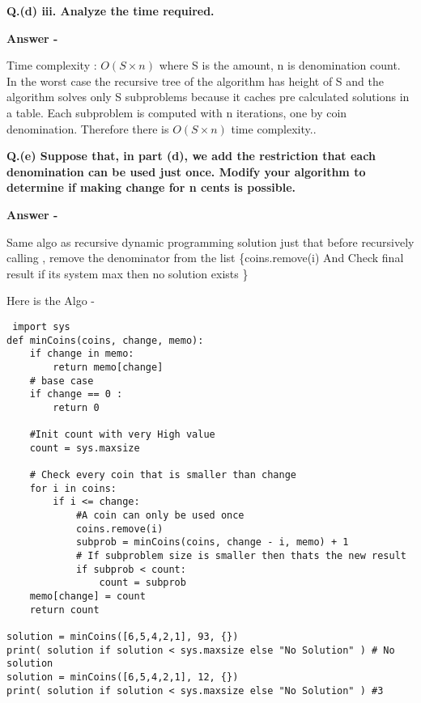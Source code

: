 \documentclass[5pt]{article}
\begin{document}
  \textbf{Q.(d) iii. Analyze the time required.} 
\setlength{\parskip}{1.2em}
\setlength{\parindent}{0em}

\textbf{Answer -}

Time complexity : $O(S \times n) $ where S is the amount, n is denomination count. In the worst case the recursive tree of the algorithm has height of S and the algorithm solves only S subproblems because it caches pre calculated solutions in a table. Each subproblem is computed with n iterations, one by coin denomination. Therefore there is $O(S \times n)$ time complexity..

  
 \textbf{Q.(e) Suppose that, in part (d), we add the restriction that each denomination can be used just once.
Modify your algorithm to determine if making change for n cents is possible.} 
\setlength{\parskip}{1.2em}
\setlength{\parindent}{0em}

\textbf{Answer -}

Same algo as recursive dynamic programming solution just that before recursively calling , remove the denominator from the list \{coins.remove(i) And 
Check final result if its system max then no solution exists 
\}

Here is the Algo -

\begin{lstlisting}
 import sys
def minCoins(coins, change, memo):
    if change in memo:
        return memo[change]
    # base case
    if change == 0 :
        return 0

    #Init count with very High value
    count = sys.maxsize

    # Check every coin that is smaller than change
    for i in coins:
        if i <= change:
            #A coin can only be used once
            coins.remove(i)
            subprob = minCoins(coins, change - i, memo) + 1
            # If subproblem size is smaller then thats the new result
            if subprob < count:
                count = subprob
    memo[change] = count
    return count

solution = minCoins([6,5,4,2,1], 93, {})
print( solution if solution < sys.maxsize else "No Solution" ) # No solution 
solution = minCoins([6,5,4,2,1], 12, {})
print( solution if solution < sys.maxsize else "No Solution" ) #3
\end{lstlisting}

\clearpage
\end{document}
